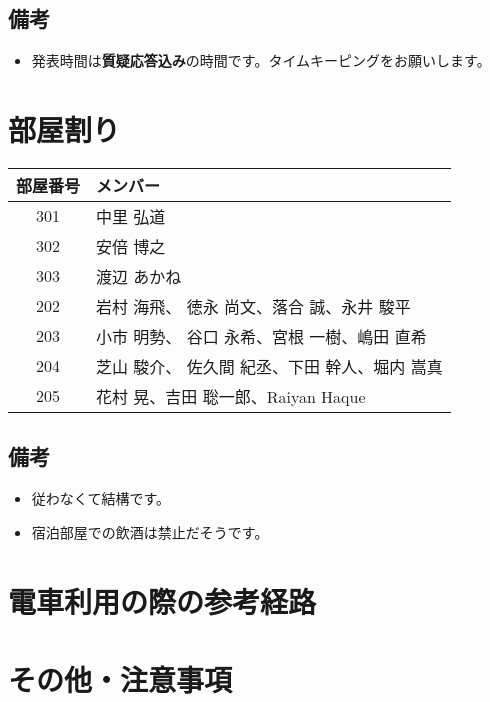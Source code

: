 \documentclass[unicode,a4paper,11pt]{ltjsarticle}
\begin{document}
\subsection*{備考}
\begin{itemize}
  \item
        発表時間は\textbf{質疑応答込み}の時間です。タイムキーピングをお願いします。
\end{itemize}


\clearpage

\section{部屋割り}

\begin{center}
  \begin{tabular}{cl}\hline
    部屋番号 & メンバー                                      \\ \hline
    301      & 中里 弘道                                     \\
    302      & 安倍 博之                                     \\
    303      & 渡辺 あかね                                   \\
    202      & 岩村 海飛、 徳永 尚文、落合 誠、永井 駿平     \\
    203      & 小市 明勢、 谷口 永希、宮根 一樹、嶋田 直希   \\
    204      & 芝山 駿介、 佐久間 紀丞、下田 幹人、堀内 嵩真 \\
    205      & 花村 晃、吉田 聡一郎、Raiyan Haque
  \end{tabular}
\end{center}

\subsection*{備考}
\begin{itemize}
  \item
        従わなくて結構です。
  \item
        宿泊部屋での飲酒は禁止だそうです。
\end{itemize}


\section{電車利用の際の参考経路}


\section{その他・注意事項}
\end{document}
